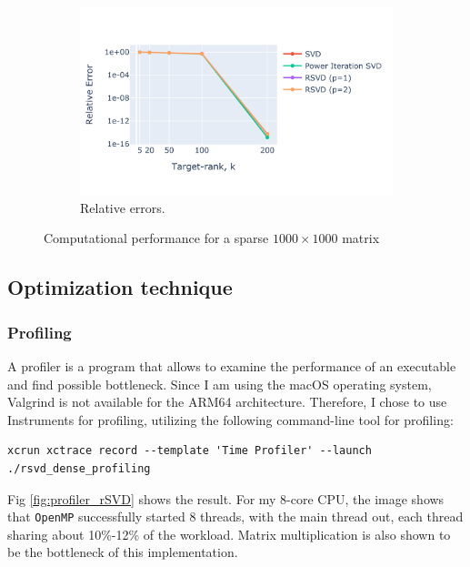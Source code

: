 \documentclass[11pt,a4paper]{article}
\begin{document}
\begin{figure}[htbp]
\begin{subfigure}[b]{0.31\textwidth}
        \includegraphics[width=\textwidth, trim={100 100 100 100}, clip]{Images/svd_error_sparse.pdf}
        \caption{Relative errors.}
        \label{fig:errors}
    \end{subfigure}

    \caption{Computational performance for a sparse $1000 \times 1000$ matrix}
    \label{fig:comparison}
\end{figure}

\subsection{Optimization technique}
\subsubsection*{Profiling}
A profiler is a program that allows to examine the performance of an executable and find possible bottleneck. Since I am using the macOS operating system, Valgrind is not available for the ARM64 architecture. Therefore, I chose to use Instruments for profiling, utilizing the following command-line tool for profiling:
\begin{verbatim}
xcrun xctrace record --template 'Time Profiler' --launch ./rsvd_dense_profiling
\end{verbatim}
Fig \ref{fig:profiler_rSVD} shows the result. For my 8-core CPU, the image shows that \texttt{OpenMP} successfully started 8 threads, with the main thread out, each thread sharing about 10\%-12\% of the workload. Matrix multiplication is also shown to be the bottleneck of this implementation.
\end{document}
